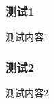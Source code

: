 \documentclass{ctexbeamer}
\begin{document}
    

    \begin{frame}
        \frametitle{测试1}
    
        测试内容1
    
    \end{frame}

    

    \begin{frame}
        \frametitle{测试2}
    
        测试内容2
    
    \end{frame}
\end{document}
